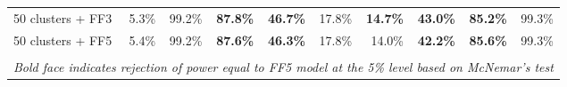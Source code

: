 \begin{table}[!h]
\begin{center}
\begin{tabular}{lrrrrrrrrr}
50 clusters + FF3	& 5.3\% & 99.2\% & \textbf{87.8\%} & \textbf{46.7\%} & 17.8\% & \textbf{14.7\%} & \textbf{43.0\%} & \textbf{85.2\%} & 99.3\% \\
50 clusters + FF5	& 5.4\% & 99.2\% & \textbf{87.6\%} & \textbf{46.3\%} & 17.8\% & 14.0\% & \textbf{42.2\%} & \textbf{85.6\%} & 99.3\% \\
\hline\\
\multicolumn{10}{l}{\itshape Bold face indicates rejection of power equal to FF5 model at the 5\% level based on McNemar's test}
    \end{tabular}
    \end{center}
\end{table}

